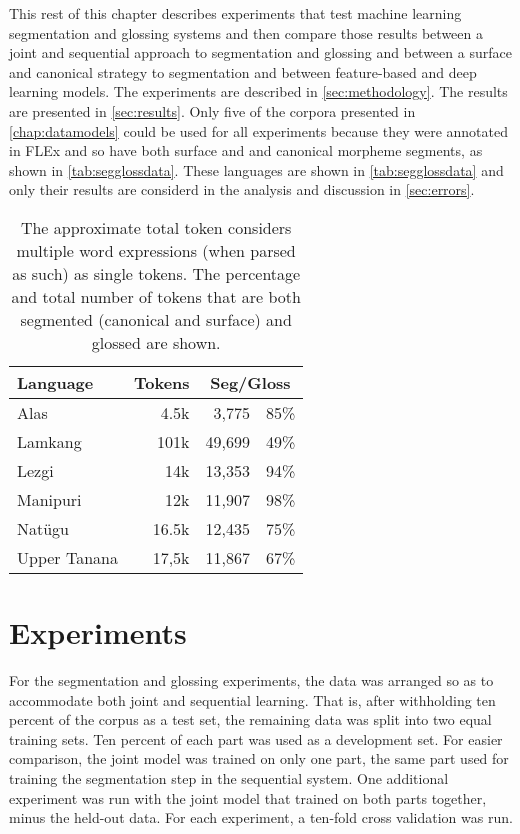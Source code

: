 This rest of this chapter describes experiments that test machine learning segmentation and glossing systems and then compare those results between a joint and sequential approach to segmentation and glossing and between a surface and canonical strategy to segmentation and between feature-based and deep learning models.  The experiments are described in \autoref{sec:methodology}. The results are presented in \autoref{sec:results}. Only five of the corpora presented in \autoref{chap:datamodels} could be used for all experiments because they were annotated in FLEx and so have both surface and and canonical morpheme segments, as shown in \autoref{tab:segglossdata}. These languages are shown in \autoref{tab:segglossdata} and only their results are considerd in the analysis and discussion in \autoref{sec:errors}.


\begin{table}[tbh]
    \centering
    \begin{tabular}{l|r|rc}
         \textbf{Language} & \textbf{Tokens} & \multicolumn{2}{c}{\textbf{Seg/Gloss}} \\
         \hline
         Alas & 4.5k & 3,775 & 85\%  \\
         \hline
         Lamkang & 101k & 49,699 & 49\% \\
         \hline
         Lezgi & 14k & 13,353  & 94\% \\
         \hline
         Manipuri & 12k & 11,907 & 98\% \\
         \hline
         Natügu & 16.5k & 12,435 & 75\%  \\
         \hline
         Upper Tanana & 17,5k & 11,867 & 67\% 
    \end{tabular}
    \caption[Data for Segmentation and Glossing]{The approximate total token considers multiple word expressions (when parsed as such) as single tokens. The percentage and total number of tokens that are both segmented (canonical and surface) and glossed are shown.}
    \label{tab:segglossdata}
\end{table}



\section{Experiments}
\label{sec:methodology}

For the segmentation and glossing experiments, the data was arranged so as to accommodate both joint and sequential learning. That is, after withholding ten percent of the corpus as a test set, the remaining data was split into two equal training sets.  Ten percent of each part was used as a development set. For easier comparison, the joint model was trained on only one part, the same part used for training the segmentation step in the sequential system. One additional experiment was run with the joint model that trained on both parts together, minus the held-out data. For each experiment, a ten-fold cross validation was run. 

